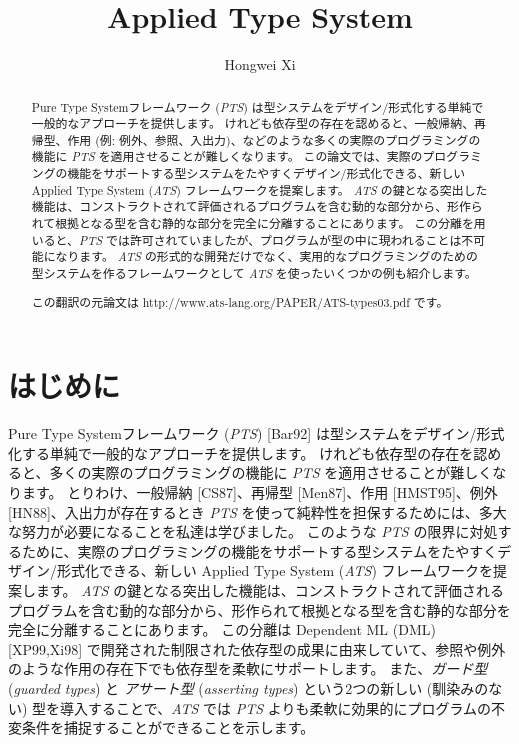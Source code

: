 \documentclass[submit,techreq,noauthor,onecolumn]{ipsj}
\begin{document}
\title{Applied Type System}

\author{Hongwei Xi}{}{}

\begin{abstract}
Pure Type Systemフレームワーク ({\it PTS}) は型システムをデザイン/形式化する単純で一般的なアプローチを提供します。
けれども依存型の存在を認めると、一般帰納、再帰型、作用 (例: 例外、参照、入出力)、などのような多くの実際のプログラミングの機能に {\it PTS} を適用させることが難しくなります。
この論文では、実際のプログラミングの機能をサポートする型システムをたやすくデザイン/形式化できる、新しい Applied Type System ({\it ATS}) フレームワークを提案します。
{\it ATS} の鍵となる突出した機能は、コンストラクトされて評価されるプログラムを含む動的な部分から、形作られて根拠となる型を含む静的な部分を完全に分離することにあります。
この分離を用いると、{\it PTS} では許可されていましたが、プログラムが型の中に現われることは不可能になります。
{\it ATS} の形式的な開発だけでなく、実用的なプログラミングのための型システムを作るフレームワークとして {\it ATS} を使ったいくつかの例も紹介します。

この翻訳の元論文は http://www.ats-lang.org/PAPER/ATS-types03.pdf です。
\end{abstract}

\maketitle
\thispagestyle{empty}

\section{はじめに}
Pure Type Systemフレームワーク ({\it PTS}) [Bar92] は型システムをデザイン/形式化する単純で一般的なアプローチを提供します。
けれども依存型の存在を認めると、多くの実際のプログラミングの機能に {\it PTS} を適用させることが難しくなります。
とりわけ、一般帰納 [CS87]、再帰型 [Men87]、作用 [HMST95]、例外 [HN88]、入出力が存在するとき {\it PTS} を使って純粋性を担保するためには、多大な努力が必要になることを私達は学びました。
このような {\it PTS} の限界に対処するために、実際のプログラミングの機能をサポートする型システムをたやすくデザイン/形式化できる、新しい Applied Type System ({\it ATS}) フレームワークを提案します。
{\it ATS} の鍵となる突出した機能は、コンストラクトされて評価されるプログラムを含む動的な部分から、形作られて根拠となる型を含む静的な部分を完全に分離することにあります。
この分離は Dependent ML (DML) [XP99,Xi98] で開発された制限された依存型の成果に由来していて、参照や例外のような作用の存在下でも依存型を柔軟にサポートします。
また、{\it ガード型} ({\it guarded types}) と {\it アサート型} ({\it asserting types}) という2つの新しい (馴染みのない) 型を導入することで、{\it ATS} では {\it PTS} よりも柔軟に効果的にプログラムの不変条件を捕捉することができることを示します。
\end{document}
